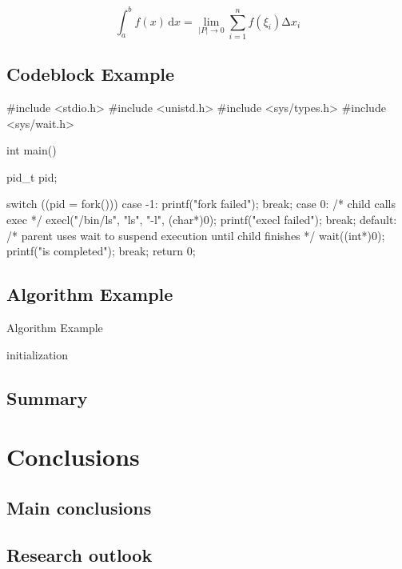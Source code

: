 \begin{equation}
  \int_{a}^b f(x)\,\mathrm{d}x=\lim_{|P|\rightarrow 0}\sum_{i=1}^n f(\xi_i)\increment x_i
\end{equation}

\section{Codeblock Example}

\begin{codeblock}[language=C]
#include <stdio.h>
#include <unistd.h>
#include <sys/types.h>
#include <sys/wait.h>

int main() {
  pid_t pid;

  switch ((pid = fork())) {
  case -1:
    printf("fork failed\n");
    break;
  case 0:
    /* child calls exec */
    execl("/bin/ls", "ls", "-l", (char*)0);
    printf("execl failed\n");
    break;
  default:
    /* parent uses wait to suspend execution until child finishes */
    wait((int*)0);
    printf("is completed\n");
    break;
  }
  return 0;
}
\end{codeblock}

\section{Algorithm Example}

\begin{algorithm}[htb]
  \caption{Algorithm Example}
  \label{algo:algorithm}
  \small
  \SetAlgoLined

  initialization\;
\end{algorithm}

\section{Summary}

\lipsum[7]

\chapter{Conclusions}

\section{Main conclusions}

\lipsum[8]

\section{Research outlook}

\lipsum[9]

